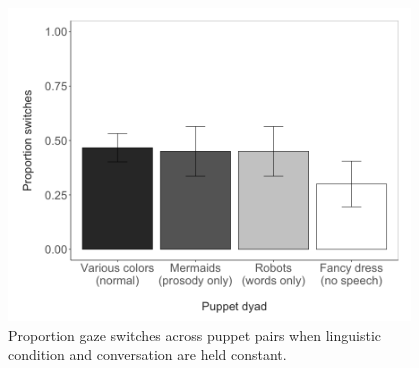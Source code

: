 \documentclass[authoryear, 12pt]{elsarticle}
\begin{document}
\begin{figure}[!htb]
\begin{center}
\includegraphics[width=0.95\textwidth]{figures/all-puppetdyads-bars.png}
\end{center}
\caption{Proportion gaze switches across puppet pairs when linguistic condition and conversation are held constant.} 
\label{fig:pairconfound}
\end{figure}

\clearpage
\end{document}
